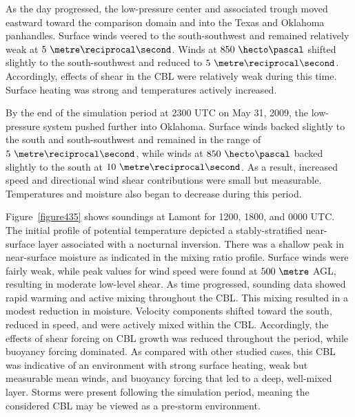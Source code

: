 As the day progressed, the low-pressure center and associated trough moved eastward toward the comparison domain and into the Texas and Oklahoma panhandles. Surface winds veered to the south-southwest and remained relatively weak at $5\mbox{ }\metre\reciprocal\second$. Winds at $850\mbox{ }\hecto\pascal$ shifted slightly to the south-southwest and reduced to $5\mbox{ }\metre\reciprocal\second$. Accordingly, effects of shear in the CBL were relatively weak during this time. Surface heating was strong and temperatures actively increased. 

By the end of the simulation period at 2300 UTC on May 31, 2009, the low-pressure system pushed further into Oklahoma. Surface winds backed slightly to the south and south-southwest and remained in the range of $5\mbox{ }\metre\reciprocal\second$, while winds at $850\mbox{ }\hecto\pascal$ backed slightly to the south at $10\mbox{ }\metre\reciprocal\second$. As a result, increased speed and directional wind shear contributions were small but measurable. Temperatures and moisture also began to decrease during this period.

Figure~\ref{figure435} shows soundings at Lamont for 1200, 1800, and 0000 UTC. The initial profile of potential temperature depicted a stably-stratified near-surface layer associated with a nocturnal inversion. There was a shallow peak in near-surface moisture as indicated in the mixing ratio profile. Surface winds were fairly weak, while peak values for wind speed were found at $500\mbox{ }\metre$ AGL, resulting in moderate low-level shear. As time progressed, sounding data showed rapid warming and active mixing throughout the CBL. This mixing resulted in a modest reduction in moisture. Velocity components shifted toward the south, reduced in speed, and were actively mixed within the CBL. Accordingly, the effects of shear forcing on CBL growth was reduced throughout the period, while buoyancy forcing dominated. As compared with other studied cases, this CBL was indicative of an environment with strong surface heating, weak but measurable mean winds, and buoyancy forcing that led to a deep, well-mixed layer. Storms were present following the simulation period, meaning the considered CBL may be viewed as a pre-storm environment. 


